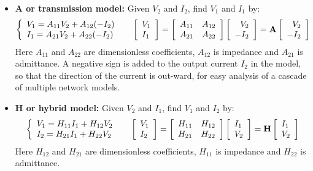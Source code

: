 \begin{itemize}
\item {\bf A or transmission model:} Given $V_2$ and $I_2$, find 
  $V_1$ and $I_1$ by:
  \[\left\{ \begin{array}{l} 
    V_1=A_{11}V_2+A_{12}(-I_2) \\
    I_1=A_{21}V_2+A_{22}(-I_2) \end{array} \right.\;\;\;\;\;
  \left[ \begin{array}{l} V_1 \\ I_1\end{array} \right]=
  \left[ \begin{array}{ll} A_{11} & A_{12}\\A_{21} & A_{22}\end{array}\right]
  \left[ \begin{array}{r} V_2 \\ -I_2\end{array} \right]
  ={\bf A}\left[ \begin{array}{r} V_2 \\ -I_2\end{array} \right]  \]
  Here $A_{11}$ and $A_{22}$ are dimensionless coefficients, $A_{12}$ is impedance 
  and $A_{21}$ is admittance. A negative sign is added to the output current $I_2$ 
  in the model, so that the direction of the current is out-ward, for easy
  analysis of a cascade of multiple network models.

\item {\bf H or hybrid model:} Given $V_2$ and $I_1$, find $V_1$ and $I_2$ by:
  \[\left\{ \begin{array}{l} 
    V_1=H_{11}I_1+H_{12}V_2 \\
    I_2=H_{21}I_1+H_{22}V_2 \end{array} \right.\;\;\;\;\;
  \left[ \begin{array}{l} V_1 \\ I_2\end{array} \right]=
  \left[ \begin{array}{ll} H_{11} & H_{12}\\H_{21} & H_{22}\end{array}\right]
  \left[ \begin{array}{l} I_1 \\ V_2\end{array} \right]
  ={\bf H}\left[ \begin{array}{l} I_1 \\ V_2\end{array} \right]  \]
  Here $H_{12}$ and $H_{21}$ are dimensionless coefficients, $H_{11}$ is impedance
  and $H_{22}$ is admittance. 

\end{itemize}

